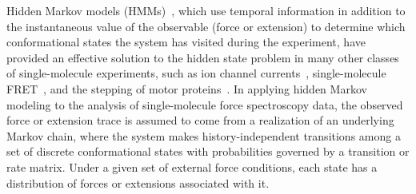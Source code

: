 \documentclass[aps,pre,twocolumn,superscriptaddress,nofootinbib,longbibliography]{revtex4-1}
\begin{document}
{Hidden Markov models (HMMs)~\cite{rabiner:ieee-proceedings:1989:hmm-tutorial}, which use temporal information in addition to the instantaneous value of the observable (force or extension) to determine which conformational states the system has visited during the experiment, have provided an effective solution to the hidden state problem in many other classes of single-molecule experiments, such as ion channel currents~\cite{becker:pfluegers-arch:1994:ion-channel-hmm,sachs:biophys-j:2000:ion-channel-hmm,degunst-kuensch-schouten:j-am-stat-assoc:2001:ion-channel-hmm,qin:biophys-j:2004:ion-channel-hmm}, single-molecule FRET~\cite{andrec-levy-talaga:jpca:2003:photon-arrival-hmm,mckinney-joo-ha:biophys-j:2006:hmm-fret,lee:jpcb:2009:hmm-fret,scherer-dinner:jpcb:2009:rna-fret-hmm,gopich-szabo:jpcb:2009:decoding-fret,KellerNoe_JACS14_HMM-FRET}, and the stepping of motor proteins~\cite{smith:biophys-j:2001:hmm-actomyosin,sachs:biophys-j:2006:motor-hmm,sigworth:biophys-j:2010:hmm-motors}.
In applying hidden Markov modeling to the analysis of single-molecule force spectroscopy data, the observed force or extension trace is assumed to come from a realization of an underlying Markov chain, where the system makes history-independent transitions among a set of discrete conformational states with probabilities governed by a transition or rate matrix.
Under a given set of external force conditions, each state has a distribution of forces or extensions associated with it.

}
\end{document}
